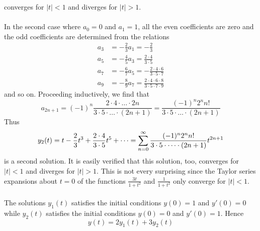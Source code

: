 \documentclass[12pt]{article}
\begin{document}
\begin{example}
converges for $|t| < 1$ and diverges for $|t| > 1$. \\~\\ In the second case where $a_0 = 0$ and $a_1 = 1$, all the even coefficients are zero and the odd coefficients are determined from the relations $$\begin{aligned} a_3 &= -\frac{2}{3}a_1 = -\frac{2}{3} \\ a_5 &= -\frac{4}{5}a_3 = \frac{2 \cdot 4}{3 \cdot 5} \\ a_7 &= -\frac{6}{7}a_5 = -\frac{2 \cdot 4 \cdot 6}{3 \cdot 5 \cdot 7} \\ a_9 &= -\frac{8}{9}a_7 = \frac{2 \cdot 4 \cdot 6 \cdot 8}{3 \cdot 5 \cdot 7 \cdot 9} \end{aligned} $$ and so on. Proceeding inductively, we find that $$a_{2n + 1} = (-1)^n \frac{2 \cdot 4 \cdot \dots \cdot 2n}{3 \cdot 5 \cdot \dots \cdot (2n + 1)} = \frac{(-1)^n2^nn!}{3 \cdot 5 \cdot \dots \cdot (2n + 1)} $$ Thus $$y_2(t) = t - \frac{2}{3}t^3 + \frac{2 \cdot 4}{3 \cdot 5}t^5 + \dots = \sum_{n = 0}^{\infty} \frac{(-1)^n2^nn!}{3 \cdot 5 \cdot \dots \cdot (2n + 1)}t^{2n + 1} $$ is a second solution. It is easily verified that this solution, too, converges for $|t| < 1$ and diverges for $|t| > 1$. This is not every surprising since the Taylor series expansions about $t = 0$ of the functions $\frac{3t}{1 + t^2}$ and $\frac{1}{1 + t^2} $ only converge for $|t| < 1$. \\~\\ The solutions $y_1(t)$ satisfies the initial conditions $y(0) = 1$ and $y'(0) = 0$ while $y_2(t)$ satisfies the initial conditions $y(0) = 0$ and $y'(0) = 1$. Hence $$ y(t) = 2y_1(t) + 3y_2(t) $$ \end{example} 
\end{document}
